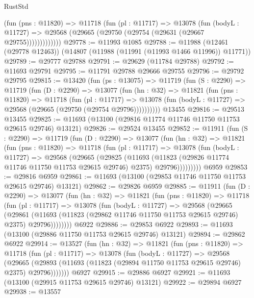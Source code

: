 \begin{lexlean}{RustStd}
\begin{coremodule}
              (fun (pns : @11820) =>
              @11718
                (fun (pl : @11717) =>
                @13078
                  (fun (bodyL : @11727) =>
                  @29568 (@29665 (@29750 (@29754 (@29631 (@29667 @29755)))))))))))))
@29778 := @11993 @1085
@29788 := @11988 (@12461 (@29778 @12463)) (@14807 (@11988 (@11991 (@11993 @1466 @11996)) @11771))
@29789 := @29777 @29788
@29791 := @29629 (@11784 @29788)
@29792 := @11693 @29791
@29795 := @11791 @29788 @29666 @29755
@29796 := @29792 @29795
@29815 := @13420
    (fun (ps : @13075) =>
    @11719
      (fun (S : @2290) =>
      @11719
        (fun (D : @2290) =>
        @13077
          (fun (hn : @32) =>
          @11821
            (fun (pns : @11820) =>
            @11718
              (fun (pl : @11717) =>
              @13078 (fun (bodyL : @11727) => @29568 (@29665 (@29750 (@29754 @29796))))))))))
    @13455
@29816 := @29513 @13455
@29825 := @11693 (@13100 (@29816 @11774 @11746 @11750 @11753 @29615 @29746) @13121)
@29826 := @29524 @13455
@29852 := @11911
    (fun (S : @2290) =>
    @11719
      (fun (D : @2290) =>
      @13077
        (fun (hn : @32) =>
        @11821
          (fun (pns : @11820) =>
          @11718
            (fun (pl : @11717) =>
            @13078
              (fun (bodyL : @11727) =>
              @29568
                (@29665
                  (@29825
                    (@11693
                      (@11823 (@29826 @11774 @11746 @11750 @11753 @29615 @29746) @2375)
                      @29796)))))))))
    @6959
@29853 := @29816 @6959
@29861 := @11693 (@13100 (@29853 @11746 @11750 @11753 @29615 @29746) @13121)
@29862 := @29826 @6959
@29885 := @11911
    (fun (D : @2290) =>
    @13077
      (fun (hn : @32) =>
      @11821
        (fun (pns : @11820) =>
        @11718
          (fun (pl : @11717) =>
          @13078
            (fun (bodyL : @11727) =>
            @29568
              (@29665
                (@29861
                  (@11693 (@11823 (@29862 @11746 @11750 @11753 @29615 @29746) @2375) @29796))))))))
    @6922
@29886 := @29853 @6922
@29893 := @11693 (@13100 (@29886 @11750 @11753 @29615 @29746) @13121)
@29894 := @29862 @6922
@29914 := @13527
    (fun (hn : @32) =>
    @11821
      (fun (pns : @11820) =>
      @11718
        (fun (pl : @11717) =>
        @13078
          (fun (bodyL : @11727) =>
          @29568
            (@29665
              (@29893 (@11693 (@11823 (@29894 @11750 @11753 @29615 @29746) @2375) @29796)))))))
    @6927
@29915 := @29886 @6927
@29921 := @11693 (@13100 (@29915 @11753 @29615 @29746) @13121)
@29922 := @29894 @6927
@29938 := @13557

\end{coremodule}
\end{lexlean}

